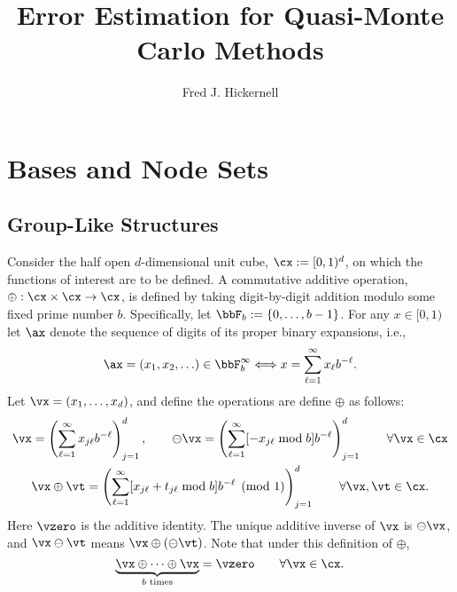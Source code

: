 \documentclass[]{elsarticle}
\theoremstyle{definition}
\begin{document}
\begin{frontmatter}

\title{Error Estimation for Quasi-Monte Carlo Methods}
\author{Fred J. Hickernell}
\address{Room E1-208, Department of Applied Mathematics, Illinois Institute of Technology,\\ 10 W.\ 32$^{\text{nd}}$ St., Chicago, IL 60616}
\begin{abstract} 
\end{abstract}

\begin{keyword}


\end{keyword}
\end{frontmatter}

\section{Bases and Node Sets}

\subsection{Group-Like Structures}
Consider the half open $d$-dimensional unit cube, $\cx:=[0,1)^d$, on which the functions of interest are to be defined. A commutative additive operation, $\oplus:\cx \times \cx \to \cx$, is defined by taking digit-by-digit addition modulo some fixed prime number $b$.  Specifically, let $\bbF_b:=\{0, \ldots, b-1\}$.  For any $x \in [0,1)$ let $\ax$ denote the sequence of digits of its proper binary expansions, i.e., 
\begin{equation*}
\ax=(x_1, x_2, \ldots ) \in \bbF_b^\infty \Longleftrightarrow x=\sum_{\ell=1}^\infty x_{\ell} b^{-\ell}.
\end{equation*}
Let $\vx=(x_1, \ldots, x_d)$, and define the operations are define $\oplus$ as follows:
\begin{gather*}
\vx = \left(\sum_{\ell=1}^{\infty} x_{j\ell} b^{-\ell}\right)_{j=1}^d, \qquad \ominus \vx = \left(\sum_{\ell=1}^{\infty} [-x_{j\ell} \bmod b] b^{-\ell}\right)_{j=1}^d \qquad \forall \vx \in \cx  \\ 
\vx \oplus \vt = \left(\sum_{\ell=1}^{\infty} [x_{j\ell} + t_{j\ell} \bmod b] b^{-\ell} \pmod{1} \right)_{j=1}^d \qquad \forall \vx, \vt \in \cx.
\end{gather*}
Here $\vzero$ is the additive identity.  The unique additive inverse of $\vx$ is $\ominus \vx$, and $\vx \ominus \vt$ means $\vx \oplus (\ominus \vt)$.  Note that under this definition of $\oplus$,
\[
\underbrace{\vx \oplus \cdots \oplus \vx}_{b \text{ times}} = \vzero \qquad \forall \vx \in \cx.
\]
\end{document}
